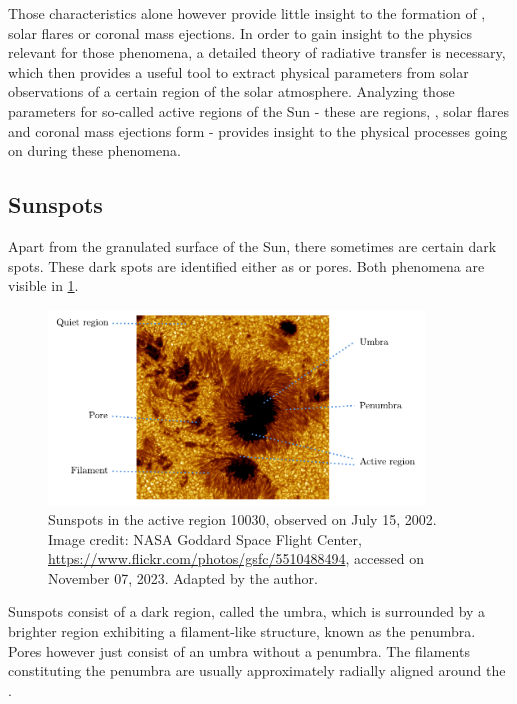 \documentclass[a4paper,11pt]{report}
\def\lk#1{{\color{black}{#1}}}
\begin{document}
Those characteristics alone however provide little insight to the formation of \lk{sunspots}, solar flares or coronal mass ejections. In order to gain insight to the physics relevant for those phenomena, a detailed theory of radiative transfer is necessary, which then provides a useful tool to extract physical parameters from solar observations of a certain region of the solar atmosphere. Analyzing those parameters for so-called active regions of the Sun - these are regions, \lk{where sunspots}, solar flares and coronal mass ejections form - provides insight to the physical processes going on during these phenomena.

\subsection{Sunspots}
Apart from the granulated surface of the Sun, there sometimes are certain dark spots. These dark spots are identified either as \lk{sunspots} or pores. Both phenomena are visible in \cref{fig:Sunspots}.
\begin{figure}[h]
\centering
\includegraphics[width=10cm]{figures/Sunspots.pdf}
\cprotect\caption{Sunspots in the active region 10030, observed on July 15, 2002. Image credit: NASA Goddard Space Flight Center, \url{https://www.flickr.com/photos/gsfc/5510488494}, accessed on November 07, 2023. Adapted by the author.}
\label{fig:Sunspots}
\end{figure}
Sunspots consist of a dark region, called the umbra, which is surrounded by a brighter region exhibiting a filament-like structure, known as the penumbra. Pores however just consist of an umbra without a penumbra. The filaments constituting the penumbra are usually approximately radially aligned around the \lk{sunspot}.
\end{document}
